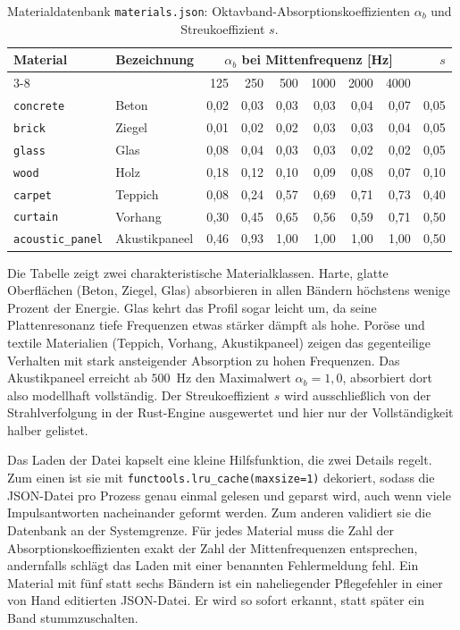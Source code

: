 \begin{table}[htbp]
    \centering
    \caption{Materialdatenbank \texttt{materials.json}:
    Oktavband-Absorptionskoeffizienten $\alpha_b$ und Streukoeffizient $s$.}
    \label{tab:materials}
    \begin{tabular}{l l r r r r r r r}
        \toprule
        Material & Bezeichnung & \multicolumn{6}{c}{$\alpha_b$ bei Mittenfrequenz [Hz]} & $s$ \\
        \cmidrule(lr){3-8}
        & & 125 & 250 & 500 & 1000 & 2000 & 4000 & \\
        \midrule
        \texttt{concrete}        & Beton         & 0,02 & 0,03 & 0,03 & 0,03 & 0,04 & 0,07 & 0,05 \\
        \texttt{brick}           & Ziegel        & 0,01 & 0,02 & 0,02 & 0,03 & 0,03 & 0,04 & 0,05 \\
        \texttt{glass}           & Glas          & 0,08 & 0,04 & 0,03 & 0,03 & 0,02 & 0,02 & 0,05 \\
        \texttt{wood}            & Holz          & 0,18 & 0,12 & 0,10 & 0,09 & 0,08 & 0,07 & 0,10 \\
        \texttt{carpet}          & Teppich       & 0,08 & 0,24 & 0,57 & 0,69 & 0,71 & 0,73 & 0,40 \\
        \texttt{curtain}         & Vorhang       & 0,30 & 0,45 & 0,65 & 0,56 & 0,59 & 0,71 & 0,50 \\
        \texttt{acoustic\_panel} & Akustikpaneel & 0,46 & 0,93 & 1,00 & 1,00 & 1,00 & 1,00 & 0,50 \\
        \bottomrule
    \end{tabular}
\end{table}

Die Tabelle zeigt zwei charakteristische Materialklassen. Harte, glatte
Oberflächen (Beton, Ziegel, Glas) absorbieren in allen Bändern höchstens wenige
Prozent der Energie. Glas kehrt das Profil sogar leicht um, da seine
Plattenresonanz tiefe Frequenzen etwas stärker dämpft als hohe. Poröse und
textile Materialien (Teppich, Vorhang, Akustikpaneel) zeigen das gegenteilige
Verhalten mit stark ansteigender Absorption zu hohen Frequenzen. Das
Akustikpaneel erreicht ab $500$~Hz den Maximalwert $\alpha_b = 1{,}0$, absorbiert
dort also modellhaft vollständig. Der Streukoeffizient $s$ wird ausschließlich
von der Strahlverfolgung in der Rust-Engine ausgewertet und hier nur der
Vollständigkeit halber gelistet.

Das Laden der Datei kapselt eine kleine Hilfsfunktion, die zwei Details regelt.
Zum einen ist sie mit \texttt{functools.lru\_cache(maxsize=1)} dekoriert, sodass
die JSON-Datei pro Prozess genau einmal gelesen und geparst wird, auch wenn
viele Impulsantworten nacheinander geformt werden. Zum anderen validiert sie die
Datenbank an der Systemgrenze. Für jedes Material muss die Zahl der
Absorptionskoeffizienten exakt der Zahl der Mittenfrequenzen entsprechen,
andernfalls schlägt das Laden mit einer benannten Fehlermeldung fehl. Ein
Material mit fünf statt sechs Bändern ist ein naheliegender Pflegefehler in einer
von Hand editierten JSON-Datei. Er wird so sofort erkannt, statt später ein Band
stummzuschalten.

